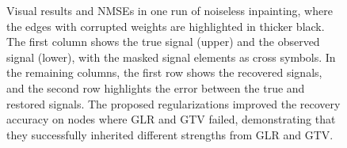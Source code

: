 \begin{figure}[t]
    \caption{Visual results and NMSEs in one run of noiseless inpainting, where the edges with corrupted weights are highlighted in thicker black.
             The first column shows the true signal (upper) and the observed signal (lower), with the masked signal elements as cross symbols. 
             In the remaining columns, the first row shows the recovered signals, and the second row highlights the error between the true and restored signals. 
             The proposed regularizations improved the recovery accuracy on nodes where GLR and GTV failed, demonstrating that they successfully inherited different strengths from GLR and GTV.}
    \label{visuals:qualitative_results}
\end{figure}